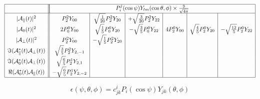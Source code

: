 \documentclass[a4paper,9pt,twoside]{article}
\begin{document}
\begin{equation}
\begin{array}{|c|| c | c | c | c | c | c |}
 \hline
&\multicolumn{6}{|c|}{ P_i^j(\cos\psi)Y_{lm}(\cos\theta,\phi) \times \frac{9}{\sqrt{4\pi}} } \\
 \hline
|{\cal A}_\parallel(t)|^2               &    P_2^2Y_{00} &  \sqrt{\frac{1}{20}} P_2^2 Y_{20} & +\sqrt{\frac{3}{20}} P_2^2Y_{22} & && \\
|{\cal A}_0(t)|^2                       &  2 P_0^0Y_{00}  & \sqrt{\frac{1}{5}} P_0^0 Y_{20} & -\sqrt{\frac{3}{5}} P_0^0 Y_{22}
                                        &  4 P_2^0Y_{00}  & \sqrt{\frac{4}{5}} P_2^0 Y_{20} & -\sqrt{\frac{12}{5}} P_2^0 Y_{22} \\
|{\cal A}_\perp(t)|^2                   &  P_2^2 Y_{00} & -\sqrt{\frac{1}{5}} P_2^2 Y_{20} &                                 &&& \\
\Im({\cal A}_\parallel^*(t){\cal A}_\perp(t)) &  \sqrt{\frac{3}{5}} P_2^2 Y_{2,-1} &&&&&\\
\Im({\cal A}_0^*(t){\cal A}_\perp(t))         &  \sqrt{\frac{6}{5}} P_2^1 Y_{2,1} &&&&&\\
\Re({\cal A}_0^*(t){\cal A}_\parallel(t))     & -\sqrt{\frac{6}{5}} P_2^1 Y_{2,-2} &&&&&\\
 \hline
\end{array}
\end{equation}



\pagebreak
\begin{equation}
   \epsilon(\psi,\theta,\phi) = c^{i}_{jk} P_i(\cos\psi)Y_{jk}(\theta,\phi)
   \label{eq:eps_exp}
\end{equation}
\end{document}
